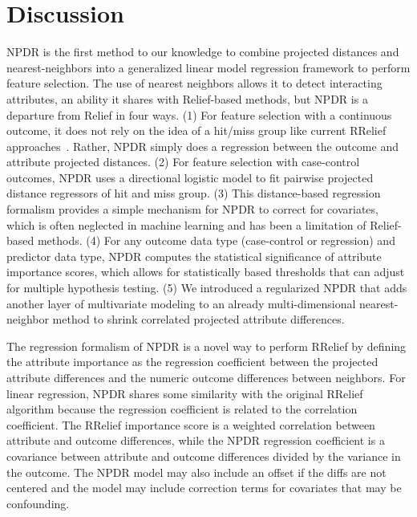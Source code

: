 \documentclass[10pt]{article}
\begin{document}
 




\section{Discussion}
NPDR is the first method to our knowledge to combine projected distances and nearest-neighbors into a generalized linear model regression framework to perform feature selection. The use of nearest neighbors allows it to detect interacting attributes, an ability it shares with Relief-based methods, but NPDR is a departure from Relief in four ways. (1) For feature selection with a continuous outcome, it does not rely on the idea of a hit/miss group like current RRelief approaches~\cite{urbanowicz17}. Rather, NPDR simply does a regression between the outcome and attribute projected distances. (2) For feature selection with case-control outcomes, NPDR uses a directional logistic model to fit pairwise projected distance regressors of hit and miss group. (3) This distance-based regression formalism provides a simple mechanism for NPDR to correct for covariates, which is often neglected in machine learning and has been a limitation of Relief-based methods. (4) For any outcome data type (case-control or regression) and predictor data type, NPDR computes the statistical significance of attribute importance scores, which allows for statistically based thresholds that can adjust for multiple hypothesis testing. (5) We introduced a regularized NPDR that adds another layer of multivariate modeling to an already multi-dimensional nearest-neighbor method to shrink correlated projected attribute differences.  

The regression formalism of NPDR is a novel way to perform RRelief by defining the attribute importance as the regression coefficient between the projected attribute differences and the numeric outcome differences between neighbors.  For linear regression, NPDR shares some similarity with the original RRelief algorithm because the regression coefficient is related to the correlation coefficient. The RRelief importance score is a weighted correlation between attribute and outcome differences, while the NPDR regression coefficient is a covariance between attribute and outcome differences divided by the variance in the outcome. The NPDR model may also include an offset if the diffs are not centered and the model may include correction terms for covariates that may be confounding. 
\end{document}
